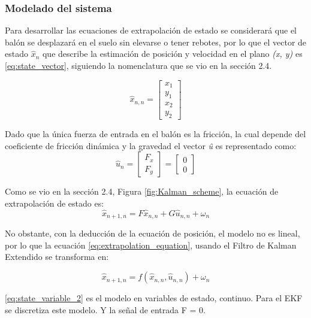 		\subsubsection*{Modelado del sistema}
Para desarrollar las ecuaciones de extrapolación de estado se considerará que el balón se desplazará en el suelo sin elevarse o tener rebotes, por lo que el vector de estado $\hat{x}_n$ que describe la estimación de posición y velocidad en el plano \textit{(x, y)} es \ref{eq:state_vector}, siguiendo la nomenclatura que se vio en la sección 2.4.

\begin{equation}
\hat{x}_{n,n} = \begin{bmatrix}
x_1\\ 
y_1\\ 
x_2\\ 
y_2
\end{bmatrix}
\label{eq:state_vector}
\end{equation}

Dado que la única fuerza de entrada en el balón es la fricción, la cual depende del coeficiente de fricción dinámica y la gravedad el vector \textit{û} es representado como:
\begin{equation}
\hat{u}_n = \begin{bmatrix}
F_x\\
F_y
\end{bmatrix} = 
\begin{bmatrix}
0\\
0
\end{bmatrix}
\label{eq:input_signal}
\end{equation}


Como se vio en la sección 2.4, Figura \ref{fig:Kalman_scheme}, la ecuación de extrapolación de estado es:
\begin{equation}
\hat{x}_{n+1,n} = F \hat{x}_{n,n} + G \hat{u}_{n,n} + \omega_n
\label{eq:extrapolation_equation}
\end{equation}

No obstante, con la deducción de la ecuación de posición, el modelo no es lineal, por lo que la ecuación \ref{eq:extrapolation_equation}, usando el Filtro de Kalman Extendido se transforma en:

\begin{equation}
\hat{x}_{n+1,n} = f(\hat{x}_{n,n}, \hat{u}_{n,n}) + \omega_n
\label{eq:efk}
\end{equation}


\ref{eq:state_variable_2} es el modelo en variables de estado, continuo. Para el EKF se discretiza este modelo. Y la señal de entrada F = 0. 

